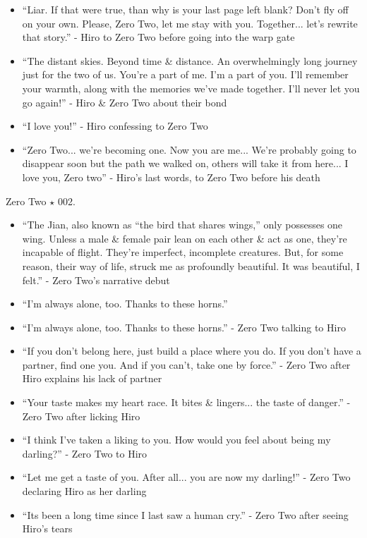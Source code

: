 \documentclass{article}
\begin{document}
\begin{enumerate}
\begin{itemize}
    	\item ``Liar. If that were true, than why is your last page left blank? Don't fly off on your own. Please, Zero Two, let me stay with you. Together... let's rewrite that story.'' - Hiro to Zero Two before going into the warp gate
    	\item ``The distant skies. Beyond time \& distance. An overwhelmingly long journey just for the two of us. You're a part of me. I'm a part of you. I'll remember your warmth, along with the memories we've made together. I'll never let you go again!'' - Hiro \& Zero Two about their bond
    	\item ``I love you!'' - Hiro confessing to Zero Two
    	\item ``Zero Two... we're becoming one. Now you are me... We're probably going to disappear soon but the path we walked on, others will take it from here... I love you, Zero two'' - Hiro's last words, to Zero Two before his death
    \end{itemize}
    {\sc Zero Two $\star$ 002.}
    \begin{itemize}
    	\item ``The Jian, also known as ``the bird that shares wings,'' only possesses one wing. Unless a male \& female pair lean on each other \& act as one, they're incapable of flight. They're imperfect, incomplete creatures. But, for some reason, their way of life, struck me as profoundly beautiful. It was beautiful, I felt.'' - Zero Two's narrative debut
    	\item ``I'm always alone, too. Thanks to these horns.''
    	\item ``I'm always alone, too. Thanks to these horns.'' - Zero Two talking to Hiro
    	\item ``If you don't belong here, just build a place where you do. If you don't have a partner, find one you. And if you can't, take one by force.'' - Zero Two after Hiro explains his lack of partner
    	\item ``Your taste makes my heart race. It bites \& lingers... the taste of danger.'' - Zero Two after licking Hiro
    	\item ``I think I've taken a liking to you. How would you feel about being my darling?'' - Zero Two to Hiro
    	\item ``Let me get a taste of you. After all... you are now my darling!'' - Zero Two declaring Hiro as her darling
    	\item ``Its been a long time since I last saw a human cry.'' - Zero Two after seeing Hiro's tears

\end{itemize}
\end{enumerate}
\end{document}
